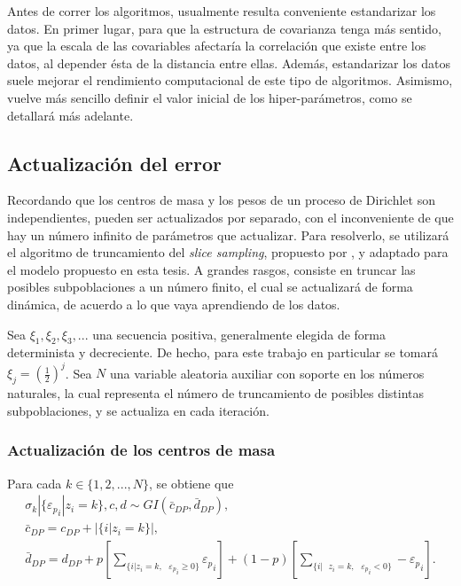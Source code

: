 Antes de correr los algoritmos, usualmente resulta conveniente estandarizar los datos. En primer lugar, para que la estructura de covarianza tenga más sentido, ya que la escala de las covariables afectaría la correlación que existe entre los datos, al depender \'esta de la distancia entre ellas. Además, estandarizar los datos suele mejorar el rendimiento computacional de este tipo de algoritmos. Asimismo, vuelve m\'as sencillo definir el valor inicial de los hiper-par\'ametros, como se detallar\'a m\'as adelante.

\subsection{Actualizaci\'on del error}

Recordando que los centros de masa y los pesos de un proceso de Dirichlet son independientes, pueden ser actualizados por separado, con el inconveniente de que hay un n\'umero infinito de par\'ametros que actualizar. Para resolverlo, se utilizará el algoritmo de truncamiento del \textit{slice sampling}, propuesto por \cite{Kalli_Slice}, y adaptado para el modelo propuesto en esta tesis. A grandes rasgos, consiste en truncar las posibles subpoblaciones a un número finito, el cual se actualizar\'a de forma din\'amica, de acuerdo a lo que vaya aprendiendo de los datos. 

Sea $\xi_1,\xi_2,\xi_3,...$ una secuencia positiva, generalmente elegida de forma determinista y decreciente. De hecho, para este trabajo en particular se tomar\'a $\xi_j = \left(\frac{1}{2}\right)^{j}$. Sea $N$ una variable aleatoria auxiliar con soporte en los n\'umeros naturales, la cual representa el n\'umero de truncamiento de posibles distintas subpoblaciones, y se actualiza en cada iteraci\'on.

\subsubsection{Actualizaci\'on de los centros de masa}

Para cada $k \in \{1,2,...,N\}$, se obtiene que 
\begin{equation*}
\begin{gathered}
    \sigma_k | \{{\varepsilon_p}_i| z_i = k\}, c, d \sim GI(\bar{c}_{DP}, \bar{d}_{DP}),\\
    \bar{c}_{DP} = c_{DP} + |\{i| z_i = k\}|, \\
    \bar{d}_{DP} = d_{DP} 
    + p \left[\sum_{\{i| z_i = k,\text{ }{\varepsilon_p}_i \geq 0\}} {\varepsilon_p}_i\right]
    + (1-p) \left[\sum_{\{i| \text{ } z_i = k,\text{ }{\varepsilon_p}_i < 0\}}  -{\varepsilon_p}_i\right].
\end{gathered}
\end{equation*}

